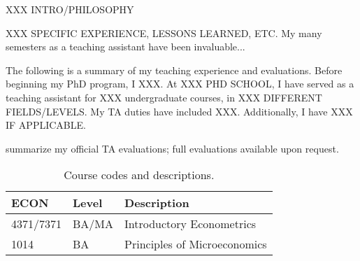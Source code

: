 \documentclass[letterpaper]{article}
\begin{document}
\onehalfspacing

XXX INTRO/PHILOSOPHY


XXX SPECIFIC EXPERIENCE, LESSONS LEARNED, ETC.
My many semesters as a teaching assistant have been invaluable...



\begin{center}
\large\decofourleft\hspace{0.2cm}\hspace{0.2cm}\decofourright
\end{center}

\onehalfspacing

The following is a summary of my teaching experience and evaluations.
% 
Before beginning my PhD program, I XXX.
At XXX PHD SCHOOL, I have served as a teaching assistant for XXX undergraduate courses, in XXX DIFFERENT FIELDS/LEVELS.
My TA duties have included XXX.
Additionally, I have XXX IF APPLICABLE.


 summarize my official TA evaluations; full evaluations available upon request.


\begin{table}[htbp]
\centering
\caption{\label{tab:key}Course codes and descriptions.}
\begin{threeparttable}
\begin{tabular}{lll}
\toprule
ECON & Level & Description \\
\midrule
4371/7371 & BA/MA & Introductory Econometrics \\
1014 & BA & Principles of Microeconomics \\
\bottomrule
\end{tabular}
\end{threeparttable}
\end{table}
\end{document}
